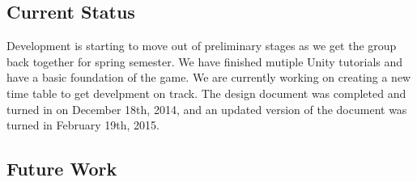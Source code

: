\documentclass[12pt]{article}       %
\begin{document}
\subsection{Current Status}

Development is starting to move out of preliminary stages as we get the group back together for spring semester. We have finished mutiple Unity tutorials and have a basic foundation of the game. We are currently working on creating a new time table to get develpment on track. The design document was completed and turned in on December 18th, 2014, and an updated version of the document was turned in February 19th, 2015. 

\subsection{Future Work}






\newpage
\end{document}
